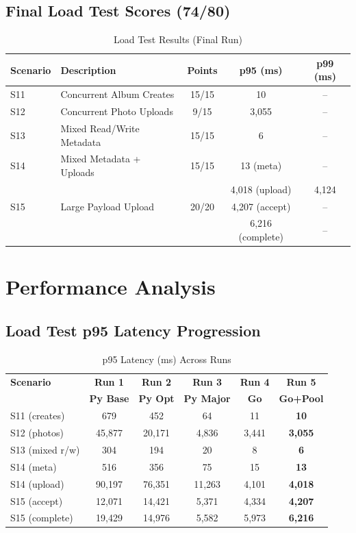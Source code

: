 \documentclass[11pt]{article}
\begin{document}
\subsection{Final Load Test Scores (74/80)}

\begin{table}[H]
\centering
\caption{Load Test Results (Final Run)}
\begin{tabular}{llccc}
\toprule
\textbf{Scenario} & \textbf{Description} & \textbf{Points} & \textbf{p95 (ms)} & \textbf{p99 (ms)} \\
\midrule
S11 & Concurrent Album Creates & 15/15 & 10 & -- \\
S12 & Concurrent Photo Uploads & 9/15 & 3,055 & -- \\
S13 & Mixed Read/Write Metadata & 15/15 & 6 & -- \\
S14 & Mixed Metadata + Uploads & 15/15 & 13 (meta) & -- \\
    &                          &       & 4,018 (upload) & 4,124 \\
S15 & Large Payload Upload & 20/20 & 4,207 (accept) & -- \\
    &                      &       & 6,216 (complete) & -- \\
\bottomrule
\end{tabular}
\end{table}

\section{Performance Analysis}

\subsection{Load Test p95 Latency Progression}

\begin{table}[H]
\centering
\caption{p95 Latency (ms) Across Runs}
\begin{tabular}{lccccc}
\toprule
\textbf{Scenario} & \textbf{Run 1} & \textbf{Run 2} & \textbf{Run 3} & \textbf{Run 4} & \textbf{Run 5} \\
 & \textbf{Py Base} & \textbf{Py Opt} & \textbf{Py Major} & \textbf{Go} & \textbf{Go+Pool} \\
\midrule
S11 (creates) & 679 & 452 & 64 & 11 & \textbf{10} \\
S12 (photos) & 45,877 & 20,171 & 4,836 & 3,441 & \textbf{3,055} \\
S13 (mixed r/w) & 304 & 194 & 20 & 8 & \textbf{6} \\
S14 (meta) & 516 & 356 & 75 & 15 & \textbf{13} \\
S14 (upload) & 90,197 & 76,351 & 11,263 & 4,101 & \textbf{4,018} \\
S15 (accept) & 12,071 & 14,421 & 5,371 & 4,334 & \textbf{4,207} \\
S15 (complete) & 19,429 & 14,976 & 5,582 & 5,973 & \textbf{6,216} \\
\bottomrule
\end{tabular}
\end{table}
\end{document}
